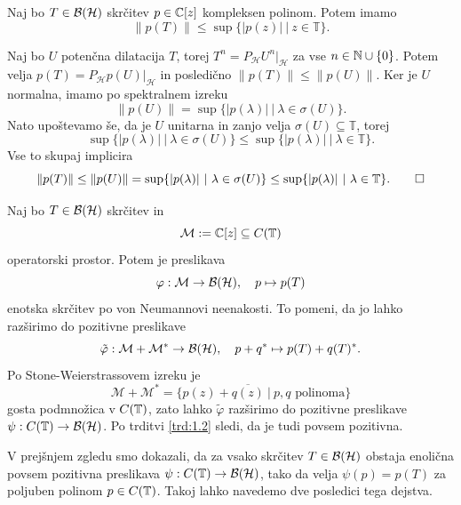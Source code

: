\begin{posledica}\label{pos:1.1}
    Naj bo $T \in \operatorname{\mathcal{B} (\mathcal{H})}$ skrčitev $p \in \mathbb C [z]$ kompleksen polinom. Potem imamo
    $$\| p(T)\| \leq \sup \{|p(z)|\ |\ z \in \mathbb{T}\}.$$
\end{posledica}

\begin{dokaz}
    Naj bo $U$ potenčna dilatacija $T$, torej
    $T^n = P_{\mathcal{H}} U^n \big|_{\mathcal{H}}$
    za vse $n \in \mathbb N \cup\{0\}$. Potem velja $p(T) = P_{\mathcal{H}} p(U)\big|_{\mathcal{H}}$
    in posledično $\| p(T)\| \leq \| p(U)\|$. Ker je $U$ normalna, imamo po spektralnem izreku
    $$\| p(U) \| = \sup \{|p(\lambda)|\ |\ \lambda \in \sigma(U)\}.$$
    Nato upoštevamo še, da je $U$ unitarna in zanjo velja $\sigma(U) \subseteq \mathbb{T}$, torej
    $$\sup \{|p(\lambda)|\ |\ \lambda \in \sigma(U)\} \leq \sup \{|p(\lambda)|\ |\ \lambda \in \mathbb{T}\}.$$
    Vse to skupaj implicira
    \begin{equation*}
        \| p(T)\| \leq \| p(U)\| = \sup \{|p(\lambda)|\ |\ \lambda \in \sigma(U)\} \leq \sup \{|p(\lambda)|\ |\ \lambda \in \mathbb{T}\}. \qedhere
    \end{equation*} 
\end{dokaz}

\begin{zgled}\label{zgl:1.7}
    Naj bo $T \in \operatorname{\mathcal{B} (\mathcal{H})}$ skrčitev in
    $$\mathcal{M} := \mathbb C [z] \subseteq C (\mathbb T)$$
    operatorski prostor. Potem je preslikava 
    $$\varphi: \mathcal{M} \to \operatorname{\mathcal{B} (\mathcal{H})},\quad p \mapsto p(T)$$
    enotska skrčitev po von Neumannovi neenakosti. To pomeni, da 
    jo lahko razširimo do pozitivne preslikave $$\tilde{\varphi}: \mathcal{M} + \mathcal{M}^* \to \operatorname{\mathcal{B} (\mathcal{H})},\quad p + q^* \mapsto p(T) + q(T)^*.$$
    Po Stone-Weierstrassovem izreku je
    \begin{equation*}
        \mathcal{M} + \mathcal{M}^* = \{p (z) + \overline{q ({z})}\ |\ \text{$p, q$ polinoma}\}
    \end{equation*}
    gosta podmnožica v $C(\mathbb T)$, zato lahko $\tilde{\varphi}$ razširimo do pozitivne preslikave $\psi: C(\mathbb T) \to \operatorname{\mathcal{B} (\mathcal{H})}$.
    Po trditvi \ref{trd:1.2} sledi, da je tudi povsem pozitivna.
\end{zgled}

V prejšnjem zgledu smo dokazali, da za vsako skrčitev $T \in \operatorname{\mathcal{B} (\mathcal{H})}$
obstaja enolična povsem pozitivna preslikava $\psi: C(\mathbb T) \to \operatorname{\mathcal{B} (\mathcal{H})}$,
tako da velja $\psi (p) = p(T)$ za poljuben polinom $p \in C(\mathbb T)$.
Takoj lahko navedemo dve posledici tega dejstva.

